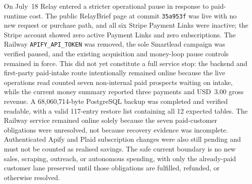 \documentclass[12pt,letterpaper]{article}
\begin{document}
On July~18 Relay entered a stricter operational pause in response to paid-runtime cost. The public RelayBrief page at commit \texttt{35a953f} was live with no new request or purchase path, and all six Stripe Payment Links were inactive; the Stripe account showed zero active Payment Links and zero subscriptions. The Railway \texttt{APIFY\_API\_TOKEN} was removed, the sole Smartlead campaign was verified paused, and the existing acquisition and money-loop pause controls remained in force. This did not yet constitute a full service stop: the backend and first-party paid-intake route intentionally remained online because the live operations read counted seven non-internal paid prospects waiting on intake, while the current money summary reported three payments and USD~3.00 gross revenue. A 68,060,714-byte PostgreSQL backup was completed and verified readable, with a valid 117-entry restore list containing all 12 expected tables. The Railway service remained online solely because the seven paid-customer obligations were unresolved, not because recovery evidence was incomplete. Authenticated Apify and Plaid subscription changes were also still pending and must not be counted as realised savings. The safe current boundary is no new sales, scraping, outreach, or autonomous spending, with only the already-paid customer lane preserved until those obligations are fulfilled, refunded, or otherwise resolved.
\end{document}

